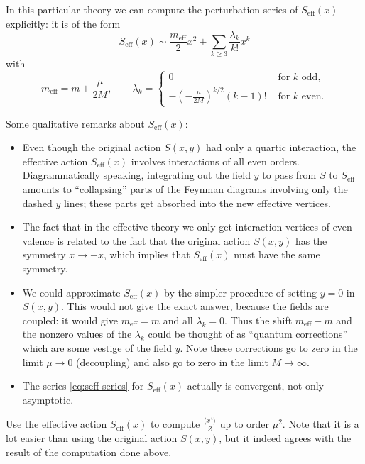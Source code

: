 \documentclass[12pt,letterpaper,reqno]{article}
\numberwithin{equation}{section}
\newcommand{\eff}{\mathrm{eff}}
\newcommand{\IP}[1]{\langle#1\rangle}
\begin{document}
In this particular theory
we can compute the perturbation series of $S_\eff(x)$ explicitly: it is of the form
\begin{equation} \label{eq:seff-series}
  S_\eff(x) \sim \frac{m_\eff}{2} x^2 + \sum_{k \ge 3} \frac{\lambda_k}{k!} x^k
\end{equation}
with
\begin{equation} \label{eq:seff-terms}
  m_\eff = m + \frac{\mu}{2M}, \qquad \lambda_k = \begin{cases} 0 & \text{ for $k$ odd,} \\ - \left( - \frac{\mu}{2M} \right)^{k/2} (k-1)! & \text{ for $k$ even.} \end{cases} 
\end{equation}

Some qualitative remarks about $S_\eff(x)$:
\begin{itemize}
\item Even though the original action $S(x,y)$ had only a quartic interaction, the
effective action $S_\eff(x)$ involves interactions of all even orders.
Diagrammatically speaking, integrating out the field $y$ to pass from $S$ 
to $S_\eff$ amounts to ``collapsing'' parts of the Feynman diagrams
involving only the dashed $y$ lines; these parts get absorbed 
into the new effective vertices.

\item The fact that in the effective theory 
we only get interaction vertices of even valence is
related to the fact that the original action $S(x,y)$ has the symmetry
$x \to -x$, which implies that $S_\eff(x)$ must have the same symmetry.

\item We could approximate $S_\eff(x)$ by the simpler procedure of setting $y=0$ in $S(x,y)$.
This would not give the exact answer, because the fields are coupled: it would
give $m_\eff = m$ and all $\lambda_k = 0$. Thus the shift $m_\eff - m$ and the nonzero 
values of the $\lambda_k$ could be thought of as ``quantum corrections'' which are some vestige
of the field $y$. Note these corrections 
go to zero in the limit $\mu \to 0$ (decoupling) and also go to
zero in the limit $M \to \infty$.
\item The series \eqref{eq:seff-series} for $S_\eff(x)$ actually is convergent, not
only asymptotic.
\end{itemize}

\begin{exercise} Use the effective action $S_\eff(x)$ to compute $\frac{\IP{x^4}}{Z}$ up to order $\mu^2$.
Note that it is a lot easier than using the original action $S(x,y)$, but it indeed agrees
with the result of the computation done above.
\end{exercise}
\end{document}
